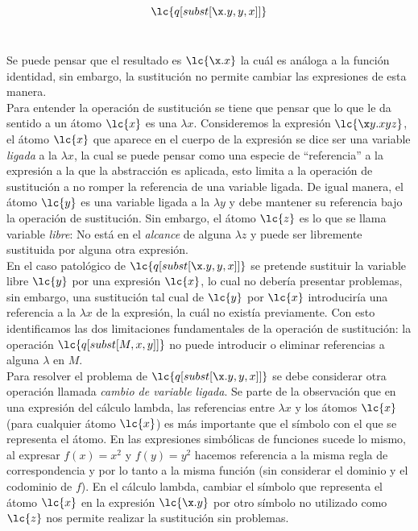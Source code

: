 \[\lc{q[subst[\x.y,y,x]]}\] \

Se puede pensar que el resultado es \(\lc{\x.x}\) la cuál es análoga a la función identidad, sin embargo, la sustitución no permite cambiar las expresiones de esta manera. \\

Para entender la operación de sustitución se tiene que pensar que lo que le da sentido a un átomo \(\lc{x}\) es una \(\lambda x\). Consideremos la expresión \(\lc{\x y.x y z}\), el átomo \(\lc{x}\) que aparece en el cuerpo de la expresión se dice ser una variable \emph{ligada} a la \(\lambda x\), la cual se puede pensar como una especie de ``referencia'' a la expresión a la que la abstracción es aplicada, esto limita a la operación de sustitución a no romper la referencia de una variable ligada. De igual manera, el átomo \(\lc{y}\) es una variable ligada a la \(\lambda y\) y debe mantener su referencia bajo la operación de sustitución. Sin embargo, el átomo \(\lc{z}\) es lo que se llama variable \emph{libre}: No está en el \emph{alcance} de alguna \(\lambda z\) y puede ser libremente sustituida por alguna otra expresión. \\

En el caso patológico de \(\lc{q[subst[\x.y,y,x]]}\) se pretende sustituir la variable libre \(\lc{y}\) por una expresión \(\lc{x}\), lo cual no debería presentar problemas, sin embargo, una sustitución tal cual de \(\lc{y}\) por \(\lc{x}\) introduciría una referencia a la \(\lambda x\) de la expresión, la cuál no existía previamente. Con esto identificamos las dos limitaciones fundamentales de la operación de sustitución: la operación \(\lc{q[subst[M,x,y]]}\) no puede introducir o eliminar referencias a alguna \(\lambda\) en \(M\). \\

Para resolver el problema de \(\lc{q[subst[\x.y,y,x]]}\) se debe considerar otra operación llamada \emph{cambio de variable ligada}. Se parte de la observación que en una expresión del cálculo lambda, las referencias entre \(\lambda x\) y los átomos \(\lc{x}\) (para cualquier átomo \(\lc{x}\)) es más importante que el símbolo con el que se representa el átomo. En las expresiones simbólicas de funciones sucede lo mismo, al expresar \(f(x)=x^{2}\) y \(f(y)=y^{2}\) hacemos referencia a la misma regla de correspondencia y por lo tanto a la misma función (sin considerar el dominio y el codominio de \(f\)). En el cálculo lambda, cambiar el símbolo que representa el átomo \(\lc{x}\) en la expresión \(\lc{\x.y}\) por otro símbolo no utilizado como \(\lc{z}\) nos permite realizar la sustitución sin problemas. \\

